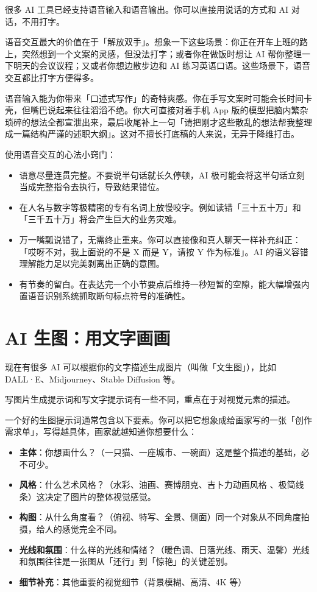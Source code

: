 很多 AI 工具已经支持语音输入和语音输出。你可以直接用说话的方式和 AI 对话，不用打字。

语音交互最大的价值在于「解放双手」。想象一下这些场景：你正在开车上班的路上，突然想到一个文案的灵感，但没法打字；或者你在做饭时想让 AI 帮你整理一下明天的会议议程；又或者你想边散步边和 AI 练习英语口语。这些场景下，语音交互都比打字方便得多。

语音输入能为你带来「口述式写作」的奇特爽感。你在手写文案时可能会长时间卡壳，但嘴巴说起来往往滔滔不绝。你大可直接对着手机 App 版的模型把脑内繁杂琐碎的想法全都宣泄出来，最后收尾补上一句「请把刚才这些散乱的想法帮我整理成一篇结构严谨的述职大纲」。这对不擅长打底稿的人来说，无异于降维打击。

使用语音交互的心法小窍门：

\begin{itemize}
  \item 语意尽量连贯完整。不要说半句话就长久停顿，AI 极可能会将这半句话立刻当成完整指令去执行，导致结果错位。
  \item 在人名与数字等极精密的专有名词上放慢咬字。例如读错「三十五十万」和「三千五十万」将会产生巨大的业务灾难。
  \item 万一嘴瓢说错了，无需终止重来。你可以直接像和真人聊天一样补充纠正：「哎呀不对，我上面说的不是 X 而是 Y，请按 Y 作为标准」。AI 的语义容错理解能力足以完美剥离出正确的意图。
  \item 有节奏的留白。在表达完一个小节要点后维持一秒短暂的空隙，能大幅增强内置语音识别系统抓取断句标点符号的准确性。
\end{itemize}

\section{AI 生图：用文字画画}

现在有很多 AI 可以根据你的文字描述生成图片（叫做「文生图」），比如 DALL·E、Midjourney、Stable Diffusion 等。

写图片生成提示词和写文字提示词有一些不同，重点在于对视觉元素的描述。

一个好的生图提示词通常包含以下要素。你可以把它想象成给画家写的一张「创作需求单」，写得越具体，画家就越知道你想要什么：

\begin{itemize}
  \item \textbf{主体}：你想画什么？（一只猫、一座城市、一碗面）这是整个描述的基础，必不可少。
  \item \textbf{风格}：什么艺术风格？（水彩、油画、赛博朋克、吉卜力动画风格 、极简线条）这决定了图片的整体视觉感觉。
  \item \textbf{构图}：从什么角度看？（俯视、特写、全景、侧面）同一个对象从不同角度拍摄，给人的感觉完全不同。
  \item \textbf{光线和氛围}：什么样的光线和情绪？（暖色调、日落光线、雨天、温馨）光线和氛围往往是一张图从「还行」到「惊艳」的关键差别。
  \item \textbf{细节补充}：其他重要的视觉细节（背景模糊、高清、4K 等）
\end{itemize}

